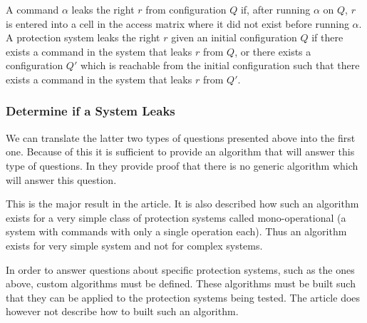 \begin{definition}
A command $\alpha$ leaks the right $r$ from configuration $Q$ if, after running $\alpha$ on $Q$, $r$ is entered into a cell in the access matrix where it did not exist before running $\alpha$.
A protection system leaks the right $r$ given an initial configuration $Q$ if there exists a command in the system that leaks $r$ from $Q$, or there exists a configuration $Q'$ which is reachable from the initial configuration such that there exists a command in the system that leaks $r$ from $Q'$.
\end{definition}

\subsubsection{Determine if a System Leaks}
We can translate the latter two types of questions presented above into the first one.
Because of this it is sufficient to provide an algorithm that will answer this type of questions.
In \cite{HRU} they provide proof that there is no generic algorithm which will answer this question.

This is the major result in the article.
It is also described how such an algorithm exists for a very simple class of protection systems called mono-operational (a system with commands with only a single operation each).
Thus an algorithm exists for very simple system and not for complex systems.

In order to answer questions about specific protection systems, such as the ones above, custom algorithms must be defined.
These algorithms must be built such that they can be applied to the protection systems being tested.
The article does however not describe how to built such an algorithm.
